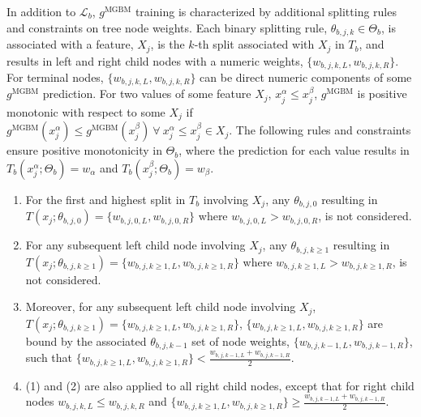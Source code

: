 \documentclass[information,article,submit,moreauthors,pdftex]{definitions/mdpi}
\begin{document}
\noindent In addition to $\mathcal{L}_{b}$, $g^\text{MGBM}$ training is characterized by additional splitting rules and constraints on tree node weights. Each binary splitting rule, $\theta_{b,j,k} \in \Theta_b$, is associated with a feature, $X_j$, is the $k$-th split associated with $X_j$ in $T_b$, and results in left and right child nodes with a numeric weights, $\{w_{b,j,k,L}, w_{b,j,k,R}\}$. For terminal nodes, $\{w_{b,j,k,L}, w_{b,j,k,R}\}$ can be direct numeric components of some $g^\text{MGBM}$ prediction. For two values of some feature $X_j$, $x^{\alpha}_j \le x^{\beta}_j$, $g^{\text{MGBM}}$ is positive monotonic with respect to some $X_j$ if $g^{\text{MGBM}}(x^{\alpha}_j) \le g^{\text{MGBM}}(x^{\beta}_j) ~\forall ~x^{\alpha}_j \le x^{\beta}_j \in X_j$. The following rules and constraints ensure positive monotonicity in $\Theta_b$, where the prediction for each value results in $T_b(x^{\alpha}_j; \Theta_b) = w_\alpha$ and $T_b(x^{\beta}_j; \Theta_b) = w_\beta$.

\begin{enumerate}[leftmargin=*,labelsep=4.9mm]
	\item For the first and highest split in $T_b$ involving $X_j$, any $\theta_{b,j,0}$ resulting in $T(x_j; \theta_{b,j,0}) = \{w_{b,j,0,L}, w_{b,j,0,R}\}$ where $w_{b,j,0,L} > w_{b,j,0,R}$, is not considered. 
	\item For any subsequent left child node involving $X_j$, any $\theta_{b,j, k\ge1}$ resulting in $T(x_j; \theta_{b,j,k\ge1}) = \{w_{b,j,k\ge1,L}, w_{b,j,k\ge1,R}\}$ where $w_{b,j,k\ge1,L} > w_{b,j,k\ge1,R}$, is not considered.
	\item Moreover, for any subsequent left child node involving $X_j$, $T(x_j; \theta_{b,j,k\ge1}) = \{w_{b,j,k\ge1,L}, w_{b,j,k\ge1,R}\}$, $\{w_{b,j,k\ge1,L}, w_{b,j,k\ge1,R}\}$ are bound by the associated $\theta_{b,j,k-1}$ set of node weights, $\{w_{b,j,k-1,L}, w_{b,j,k-1, R}\}$, such that $ \{w_{b,j,k\ge1,L}, w_{b,j,k\ge1,R}\} < \frac{w_{b,j,k-1,L} + w_{b,j,k-1,R}}{2}$.
	\item (1) and (2) are also applied to all right child nodes, except that for right child nodes $ w_{b,j,k,L} \le w_{b,j,k,R}$ and $\{w_{b,j,k\ge1,L}, w_{b,j,k\ge1,R}\} \ge \frac{w_{b,j,k-1,L} + w_{b,j,k-1,R}}{2}$.
\end{enumerate}
\end{document}
